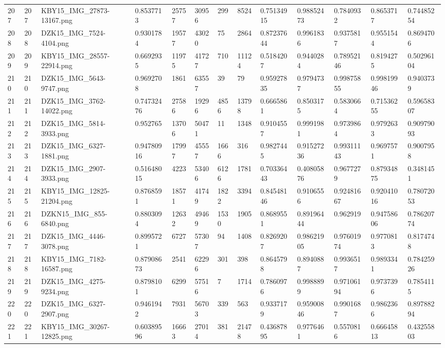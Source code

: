 \documentclass[11pt, a4paper, twoside]{report}
\begin{document}
\begin{longtable}[c]{@{}lllllllllllll@{}}
207 & 207 & KBY15\_IMG\_27873-13167.png & 0.8537713 & 25757 & 30956 & 299 & 8524 & 0.75134915 & 0.98852473 & 0.7840932 & 0.8653717 & 0.74485254 \\
208 & 208 & DZK15\_IMG\_7524-4104.png & 0.9301784 & 19577 & 43020 & 75 & 2864 & 0.87237644 & 0.9961836 & 0.9375817 & 0.9551544 & 0.8694706 \\
209 & 209 & KBY15\_IMG\_28557-22914.png & 0.6692935 & 11975 & 41727 & 710 & 11124 & 0.5184207 & 0.9440284 & 0.78952146 & 0.8194275 & 0.50296104 \\
210 & 210 & DZK15\_IMG\_5643-9747.png & 0.9692708 & 1861 & 63557 & 39 & 79 & 0.95927835 & 0.9794737 & 0.99875855 & 0.99819946 & 0.9403739 \\
211 & 211 & DZK15\_IMG\_3762-14022.png & 0.74732476 & 27586 & 19296 & 4856 & 13798 & 0.6665861 & 0.8503175 & 0.5830664 & 0.71536255 & 0.59658307 \\
212 & 212 & DZK15\_IMG\_5814-3933.png & 0.952765 & 13706 & 50471 & 11 & 1348 & 0.9104557 & 0.9991981 & 0.9739864 & 0.9792633 & 0.90979093 \\
213 & 213 & DZK15\_IMG\_6327-1881.png & 0.94780916 & 17997 & 45557 & 1666 & 316 & 0.9827445 & 0.91527236 & 0.99311143 & 0.9697571 & 0.9007958 \\
214 & 214 & DZK15\_IMG\_2907-3933.png & 0.51648015 & 4223 & 53406 & 6126 & 1781 & 0.70336443 & 0.40805876 & 0.9677279 & 0.87934875 & 0.3481451 \\
215 & 215 & KBY15\_IMG\_12825-21204.png & 0.8768591 & 18571 & 41749 & 1822 & 3394 & 0.84548146 & 0.9106556 & 0.92481667 & 0.92041016 & 0.78072053 \\
216 & 216 & DZKN15\_IMG\_855-6840.png & 0.8803094 & 12632 & 49469 & 1530 & 1905 & 0.8689551 & 0.89196444 & 0.962919 & 0.94758606 & 0.78620774 \\
217 & 217 & DZK15\_IMG\_4446-3078.png & 0.8995721 & 6727 & 57307 & 94 & 1408 & 0.8269207 & 0.98621905 & 0.97601974 & 0.9770813 & 0.8174748 \\
218 & 218 & KBY15\_IMG\_7182-16587.png & 0.87908673 & 2541 & 62296 & 301 & 398 & 0.8645798 & 0.8940887 & 0.9936517 & 0.9893341 & 0.78425926 \\
219 & 219 & DZK15\_IMG\_4275-9234.png & 0.8798101 & 6299 & 57516 & 7 & 1714 & 0.7860976 & 0.9988899 & 0.97106194 & 0.9737396 & 0.7854115 \\
220 & 220 & DZK15\_IMG\_6327-2907.png & 0.9461942 & 7931 & 56703 & 339 & 563 & 0.9337179 & 0.95900846 & 0.9901687 & 0.9862366 & 0.89788294 \\
221 & 221 & KBY15\_IMG\_30267-12825.png & 0.60389596 & 16663 & 27014 & 381 & 21478 & 0.43687895 & 0.9776461 & 0.5570816 & 0.66645813 & 0.43255803 \\

\end{longtable}
\end{document}
